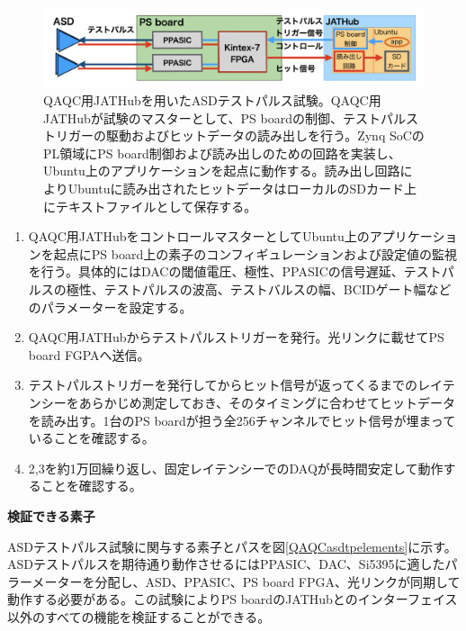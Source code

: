 \begin{figure} 
\centering
\includegraphics[width=16cm]{fig/QAQCasdtp.png}
\caption[QAQC用JATHubを用いたASDテストパルス試験]{QAQC用JATHubを用いたASDテストパルス試験。QAQC用JATHubが試験のマスターとして、PS boardの制御、テストパルストリガーの駆動およびヒットデータの読み出しを行う。Zynq SoCのPL領域にPS board制御および読み出しのための回路を実装し、Ubuntu上のアプリケーションを起点に動作する。読み出し回路によりUbuntuに読み出されたヒットデータはローカルのSDカード上にテキストファイルとして保存する。}
\label{QAQCasdtp}
\end{figure}

\begin{enumerate}
    \item QAQC用JATHubをコントロールマスターとしてUbuntu上のアプリケーションを起点にPS board上の素子のコンフィギュレーションおよび設定値の監視を行う。具体的にはDACの閾値電圧、極性、PPASICの信号遅延、テストパルスの極性、テストパルスの波高、テストバルスの幅、BCIDゲート幅などのパラメーターを設定する。
    \baselineskip

    \item QAQC用JATHubからテストパルストリガーを発行。光リンクに載せてPS board FGPAへ送信。
    \baselineskip

    \item テストパルストリガーを発行してからヒット信号が返ってくるまでのレイテンシーをあらかじめ測定しておき、そのタイミングに合わせてヒットデータを読み出す。1台のPS boardが担う全256チャンネルでヒット信号が埋まっていることを確認する。
    \baselineskip

    \item 2,3を約1万回繰り返し、固定レイテンシーでのDAQが長時間安定して動作することを確認する。
\end{enumerate}

\textbf{検証できる素子}\par
ASDテストパルス試験に関与する素子とパスを図\ref{QAQCasdtpelements}に示す。ASDテストパルスを期待通り動作させるにはPPASIC、DAC、Si5395に適したパラーメーターを分配し、ASD、PPASIC、PS board FPGA、光リンクが同期して動作する必要がある。この試験によりPS boardのJATHubとのインターフェイス以外のすべての機能を検証することができる。
\baselineskip

